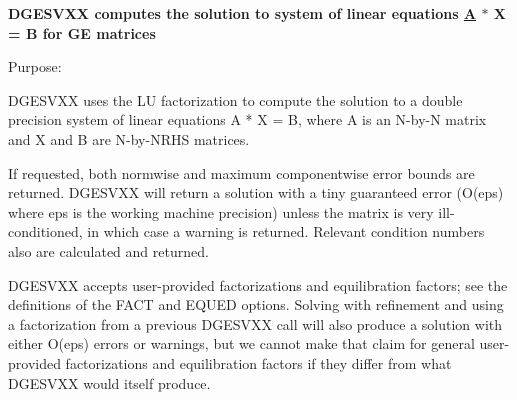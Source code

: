 {\bfseries  D\+G\+E\+S\+V\+X\+X computes the solution to system of linear equations \hyperlink{classA}{A} $\ast$ X = B for G\+E matrices} 

 \begin{DoxyParagraph}{Purpose\+: }
\begin{DoxyVerb}    DGESVXX uses the LU factorization to compute the solution to a
    double precision system of linear equations  A * X = B,  where A is an
    N-by-N matrix and X and B are N-by-NRHS matrices.

    If requested, both normwise and maximum componentwise error bounds
    are returned. DGESVXX will return a solution with a tiny
    guaranteed error (O(eps) where eps is the working machine
    precision) unless the matrix is very ill-conditioned, in which
    case a warning is returned. Relevant condition numbers also are
    calculated and returned.

    DGESVXX accepts user-provided factorizations and equilibration
    factors; see the definitions of the FACT and EQUED options.
    Solving with refinement and using a factorization from a previous
    DGESVXX call will also produce a solution with either O(eps)
    errors or warnings, but we cannot make that claim for general
    user-provided factorizations and equilibration factors if they
    differ from what DGESVXX would itself produce.\end{DoxyVerb}
 
\end{DoxyParagraph}
